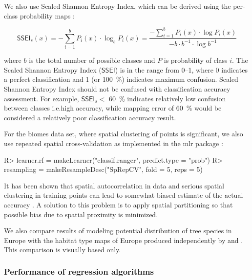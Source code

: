 \documentclass[fleqn,10pt,lineno]{wlpeerj} %
\begin{document}
We also use Scaled Shannon Entropy Index, which can be derived using the per-class probability maps \citep{shannon1949communication,borda2011fundamentals}:

\begin{equation} \label{E:SSEI}
\mathsf{SSEI}_s(x) = -\sum_{i=1}^b{ P_i(x) \cdot \log_b P_i(x)} = \frac{ -\sum_{i=1}^b{ P_i(x) \cdot \log P_i(x)} }{ - b \cdot b^{-1} \cdot \log b^{-1} } 
\end{equation}

\noindent where $b$ is the total number of possible classes and $P$ is probability of class $i$. The Scaled Shannon Entropy Index ($\mathsf{SSEI}$) is in the range from 0--1, where 0 indicates a perfect classification and 1 (or \SI{100}{\percent}) indicates maximum confusion. Scaled Shannon Entropy Index should not be confused with classification accuracy assessment. For example, $\mathsf{SSEI}_s <$ \SI{60}{\percent} indicates relatively low confusion between classes i.e.\@ high accuracy, while mapping error of \SI{60}{\percent} would be considered a relatively poor classification accuracy result.\par

For the biomes data set, where spatial clustering of points is significant, we also use repeated spatial cross-validation as implemented in the \textsf{mlr} package \citep{mlr2016}: 

\begin{Schunk}
\begin{Sinput}
R> learner.rf = makeLearner("classif.ranger", predict.type = "prob")
R> resampling = makeResampleDesc("SpRepCV", fold = 5, reps = 5)
\end{Sinput}
\end{Schunk}

It has been shown that spatial autocorrelation in data and serious spatial clustering in training points can lead to somewhat biased estimate of the actual accuracy \citep{Brenning2012}. A solution to this problem is to apply spatial partitioning so that possible bias due to spatial proximity is minimized.\par

We also compare results of modeling potential distribution of tree species in Europe with the habitat type maps of Europe produced independently by \citet{san2016european} and \citet{brus2012statistical}. This comparison is visually based only.\par

\subsubsection*{Performance of regression algorithms}
\end{document}

